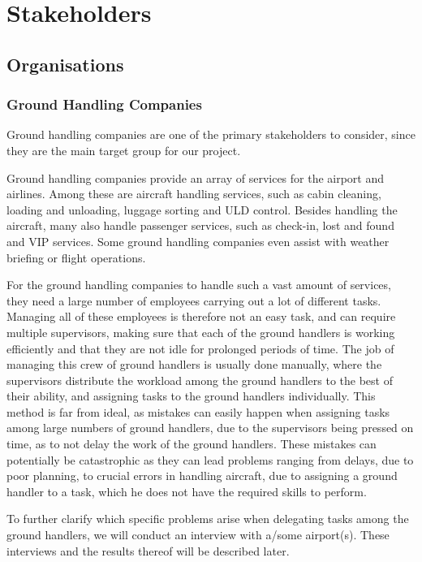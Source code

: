 \chapter{Stakeholders}
\section{Organisations}
\subsection{Ground Handling Companies}
Ground handling companies are one of the primary stakeholders to consider, since they are the main target group for our project.

Ground handling companies provide an array of services for the airport and airlines. Among these are aircraft handling services, such as cabin cleaning, loading and unloading, luggage sorting and ULD control. Besides handling the aircraft, many also handle passenger services, such as check-in, lost and found and VIP services. Some ground handling companies even assist with weather briefing or flight operations.

For the ground handling companies to handle such a vast amount of services, they need a large number of employees carrying out a lot of different tasks. Managing all of these employees is therefore not an easy task, and can require multiple supervisors, making sure that each of the ground handlers is working efficiently and that they are not idle for prolonged periods of time. The job of managing this crew of ground handlers is usually done manually, where the supervisors distribute the workload among the ground handlers to the best of their ability, and assigning tasks to the ground handlers individually.
This method is far from ideal, as mistakes can easily happen when assigning tasks among large numbers of ground handlers, due to the supervisors being pressed on time, as to not delay the work of the ground handlers. These mistakes can potentially be catastrophic as they can lead problems ranging from delays, due to poor planning, to crucial errors in handling aircraft, due to assigning a ground handler to a task, which he does not have the required skills to perform.

To further clarify which specific problems arise when delegating tasks among the ground handlers, we will conduct an interview with a/some airport(s). These interviews and the results thereof will be described later.